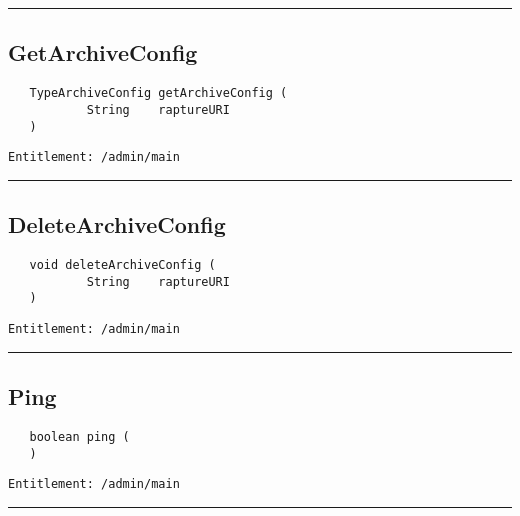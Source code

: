 \rule{12cm}{2pt}
\subsection{GetArchiveConfig}
\label{Api:GetArchiveConfig}
\begin{verbatim}
   TypeArchiveConfig getArchiveConfig (
           String    raptureURI
   )
\end{verbatim}
\begin{Verbatim}[fontsize=\small, formatcom=\color{Maroon}]
  Entitlement: /admin/main
\end{Verbatim}



\rule{12cm}{2pt}
\subsection{DeleteArchiveConfig}
\label{Api:DeleteArchiveConfig}
\begin{verbatim}
   void deleteArchiveConfig (
           String    raptureURI
   )
\end{verbatim}
\begin{Verbatim}[fontsize=\small, formatcom=\color{Maroon}]
  Entitlement: /admin/main
\end{Verbatim}



\rule{12cm}{2pt}
\subsection{Ping}
\label{Api:Ping}
\begin{verbatim}
   boolean ping (
   )
\end{verbatim}
\begin{Verbatim}[fontsize=\small, formatcom=\color{Maroon}]
  Entitlement: /admin/main
\end{Verbatim}



\rule{12cm}{2pt}
